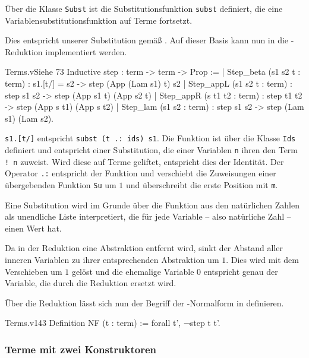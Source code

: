 Über die Klasse \texttt{Subst} ist die Substitutionsfunktion \texttt{subst} definiert, die eine 
Variablensubstitutionsfunktion auf Terme fortsetzt. 
\begin{icode}
\end{icode}
Dies entspricht unserer Substitution gemäß .
Auf dieser Basis kann nun in  die \tbeta-Reduktion implementiert werden.
\begin{code}[step]{Terms.v}{Siehe }{73}
Inductive step : term -> term -> Prop :=
  | Step_beta (s1 s2 t : term) :
      s1.[t/] = s2 -> step (App (Lam s1) t) s2
  | Step_appL (s1 s2 t : term) :
      step s1 s2 -> step (App s1 t) (App s2 t)
  | Step_appR (s t1 t2 : term) :
      step t1 t2 -> step (App s t1) (App s t2)
  | Step_lam (s1 s2 : term) :
      step s1 s2 -> step (Lam s1) (Lam s2).
\end{code}
\begin{remark}
    \texttt{s1.[t/]} entspricht \texttt{subst (t .: ids) s1}. Die Funktion  ist über die Klasse \texttt{Ids} definiert und entspricht einer Substitution, die einer Variablen \texttt{n} ihren den Term \texttt{! n} zuweist. Wird diese auf Terme geliftet, entspricht dies der Identität. Der Operator \texttt{.:} entspricht der Funktion  und verschiebt die Zuweisungen einer übergebenden Funktion \texttt{Su} um $1$ und überschreibt die erste Position mit \texttt{m}. 
    
    Eine Substitution wird im Grunde über die Funktion aus den natürlichen Zahlen als unendliche Liste interpretiert, die für jede Variable -- also natürliche Zahl -- einen Wert hat.
    
    Da in der Reduktion eine Abstraktion entfernt wird, sinkt der Abstand aller inneren Variablen zu ihrer entsprechenden Abstraktion um $1$. Dies wird mit dem Verschieben um $1$ gelöst und die ehemalige Variable $0$ entspricht genau der Variable, die durch die Reduktion ersetzt wird.
\end{remark}

Über die Reduktion lässt sich nun der Begriff der \tbeta-Normalform in  definieren.
\begin{code}[NF]{Terms.v}{}{143}
Definition NF (t : term) := forall t', ¬step t t'.
\end{code}

\subsubsection{Terme mit zwei Konstruktoren}

